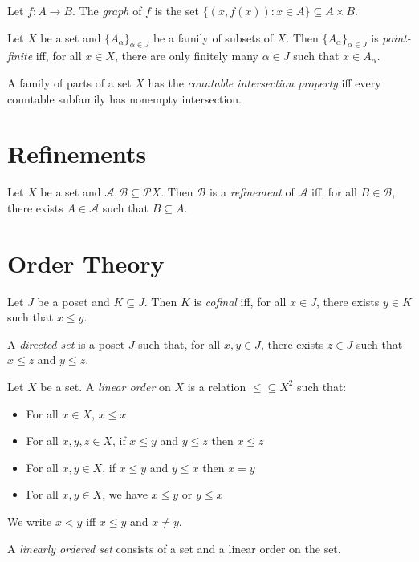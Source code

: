 \begin{df}[Graph]
  Let $f : A \rightarrow B$. The \emph{graph} of $f$ is the set $\{ (x, f(x))
  : x \in A \} \subseteq A \times B$.
\end{df}

 \begin{df}
 Let $X$ be a set and $\{ A_\alpha \}_{\alpha \in J}$ be a family of subsets
 of $X$. Then $\{ A_\alpha \}_{\alpha \in J}$ is \emph{point-finite} iff, for
all $x \in X$, there are only finitely many $\alpha \in J$ such that $x \in
A_\alpha$.
\end{df}

\begin{df}
  A family of parts of a set $X$ has the \emph{countable intersection property} iff every countable subfamily has nonempty intersection.
\end{df}

\section{Refinements}

\begin{df}[Refinement]
  Let $X$ be a set and $\mathcal{A}, \mathcal{B} \subseteq \mathcal{P} X$. Then $\mathcal{B}$ is a \emph{refinement} of $\mathcal{A}$ iff, for all $B \in \mathcal{B}$, there exists $A \in \mathcal{A}$ such that $B \subseteq A$.
\end{df}

\section{Order Theory}

  \begin{df}[Cofinal]
  Let $J$ be a poset and $K \subseteq J$. Then $K$ is \emph{cofinal} iff, for
all $x \in J$, there exists $y \in K$ such that $x \leq y$.
\end{df}

  \begin{df}
  A \emph{directed set} is a poset $J$ such that, for all $x, y \in J$, there
exists $z \in J$ such that $x \leq z$ and $y \leq z$.
\end{df}

\begin{df}
  Let $X$ be a set. A \emph{linear order} on $X$ is a relation $\leq
  \subseteq X^2$ such that:
  \begin{itemize}
    \item For all $x \in X$, $x \leq x$
    \item For all $x, y, z \in X$, if $x \leq y$ and $y \leq z$ then $x \leq
    z$
    \item For all $x, y \in X$, if $x \leq y$ and $y \leq x$ then $x = y$
    \item For all $x, y \in X$, we have $x \leq y$ or $y \leq x$
  \end{itemize}
  We write $x < y$ iff $x \leq y$ and $x \neq y$.

  A \emph{linearly ordered set} consists of a set and a linear order on the
  set.
\end{df}

